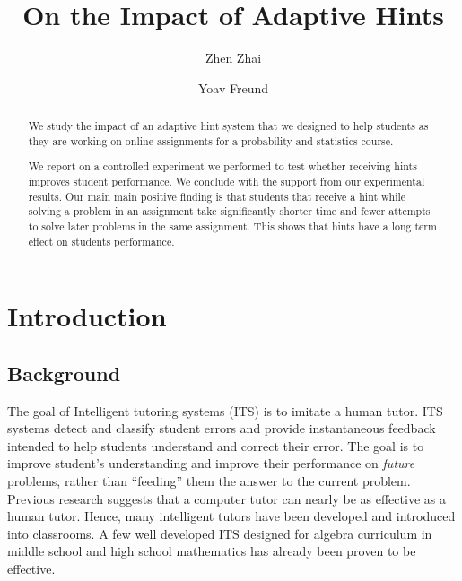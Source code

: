 \documentclass{llncs2e/llncs}
\title{On the Impact of Adaptive Hints}
\author{Zhen Zhai\inst{1} \and Yoav Freund\inst{2}}
\institute{UC San Diego \email{zzhai@eng.ucsd.edu} \and UC San Diego \email{yfreund@eng.ucsd.edu}}
\begin{document}
\maketitle

\begin{abstract}

We study the impact of an adaptive hint system that we designed to
help students as they are working on online assignments for a
probability and statistics course.

We report on a controlled experiment we performed to test whether
receiving hints improves student performance. We conclude with the
support from our experimental results. Our main main positive finding
is that students that receive a hint while solving a problem in an
assignment take significantly shorter time and fewer attempts to solve
later problems in the same assignment. This shows that hints have a
long term effect on students performance.

\end{abstract}



\section{Introduction}



\subsection*{Background}
The goal of Intelligent tutoring systems (ITS)\cite{Anderson1995} is to imitate a human tutor.  ITS systems detect and classify student errors and provide instantaneous feedback intended to help students
understand and correct their error. The goal is to improve
student's understanding and improve their performance on {\em future} problems, rather than ``feeding'' them the answer to the current problem.  Previous research suggests that a computer tutor can nearly be as effective as a human tutor\cite{Vanlehn2011}. Hence, many intelligent tutors have been developed and introduced into classrooms. A few well developed ITS designed for algebra curriculum in middle school and high school mathematics has already been proven
to be effective\cite{Koedinger1997,John2014}.
\end{document}

